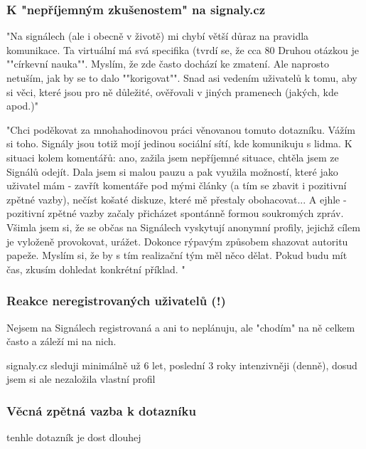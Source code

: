 \subsubsection{K "nepříjemným zkušenostem" na signaly.cz}

"Na signálech (ale i obecně v životě) mi chybí větší důraz na pravidla komunikace. Ta virtuální má svá specifika (tvrdí se, že cca 80%
Druhou otázkou je ""církevní nauka"". Myslím, že zde často dochází ke zmatení. Ale naprosto netuším, jak by se to dalo ""korigovat"". Snad asi vedením uživatelů k tomu, aby si věci, které jsou pro ně důležité, ověřovali v jiných pramenech (jakých, kde apod.)"

"Chci poděkovat za mnohahodinovou práci věnovanou tomuto dotazníku. Vážím si toho. Signály jsou totiž mojí jedinou sociální sítí, kde komunikuju s lidma.
K situaci kolem komentářů: ano, zažila jsem nepříjemné situace, chtěla jsem ze Signálů odejít. Dala jsem si malou pauzu a pak využila možností, které jako uživatel mám - zavřít komentáře pod mými články (a tím se zbavit i pozitivní zpětné vazby), nečíst košaté diskuze, které mě přestaly obohacovat... A ejhle - pozitivní zpětné vazby začaly přicházet spontánně formou soukromých zpráv.
Všimla jsem si, že se občas na Signálech vyskytují anonymní profily, jejichž cílem je vyloženě provokovat, urážet. Dokonce rýpavým způsobem shazovat autoritu papeže. Myslím si, že by s tím realizační tým měl něco dělat. Pokud budu mít čas, zkusím dohledat konkrétní příklad. "

\subsubsection{Reakce neregistrovaných uživatelů (!)}

Nejsem na Signálech registrovaná a ani to neplánuju, ale "chodím" na ně celkem často a záleží mi na nich.

signaly.cz sleduji minimálně už 6 let, poslední 3 roky intenzivněji (denně), dosud jsem si ale nezaložila vlastní profil

\subsubsection{Věcná zpětná vazba k dotazníku}

tenhle dotazník je dost dlouhej


